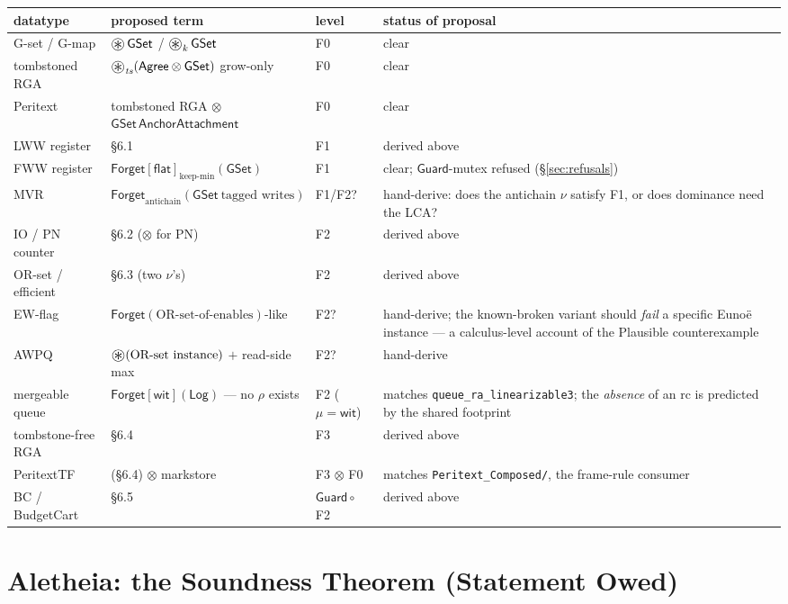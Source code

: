 \documentclass[11pt]{article}
\newcommand{\lean}[1]{\texttt{#1}}
\newcommand{\Forget}{\mathsf{Forget}}
\newcommand{\Guard}{\mathsf{Guard}}
\newcommand{\GSet}{\mathsf{GSet}}
\newcommand{\Agree}{\mathsf{Agree}}
\newcommand{\Log}{\mathsf{Log}}
\newcommand{\sepmap}{\mathop{\vcenter{\hbox{\Large$\circledast$}}}}
\newcommand{\ts}{\mathit{ts}}
\renewcommand{\flat}{\mathsf{flat}}
\newcommand{\wit}{\mathsf{wit}}
\begin{document}
\begin{center}
\small
\begin{tabular}{@{}lp{2.0in}lp{1.7in}@{}}
\toprule
datatype & proposed term & level & status of proposal \\
\midrule
G-set / G-map & $\sepmap \GSet$ / $\sepmap_k \GSet$ & F0 & clear \\
tombstoned RGA & $\sepmap_{\ts} (\Agree \otimes \GSet)$ grow-only
  & F0 & clear \\
Peritext & tombstoned RGA $\otimes$ $\GSet\,\mathsf{AnchorAttachment}$
  & F0 & clear \\
LWW register & \S6.1 & F1 & derived above \\
FWW register & $\Forget[\flat]_{\text{keep-min}}(\GSet)$ & F1
  & clear; $\Guard$-mutex refused (\S\ref{sec:refusals}) \\
MVR & $\Forget_{\text{antichain}}(\GSet\ \text{tagged writes})$
  & F1/F2? & hand-derive: does the antichain $\nu$ satisfy F1, or does
    dominance need the LCA? \\
IO / PN counter & \S6.2 ($\otimes$ for PN) & F2 & derived above \\
OR-set / efficient & \S6.3 (two $\nu$'s) & F2 & derived above \\
EW-flag & $\Forget(\text{OR-set-of-enables})$-like & F2?
  & hand-derive; the known-broken variant should \emph{fail} a specific
    Euno\"e instance --- a calculus-level account of the Plausible
    counterexample \\
AWPQ & $\sepmap (\text{OR-set instance})$ $+$ read-side max & F2?
  & hand-derive \\
mergeable queue & $\Forget[\wit](\Log)$ --- no $\rho$ exists
  & F2 ($\mu = \wit$)
  & matches \lean{queue\_ra\_linearizable3}; the \emph{absence} of an rc
    is predicted by the shared footprint \\
tombstone-free RGA & \S6.4 & F3 & derived above \\
PeritextTF & (\S6.4) $\otimes$ markstore & F3 $\otimes$ F0
  & matches \lean{Peritext\_Composed/}, the frame-rule consumer \\
BC / BudgetCart & \S6.5 & $\Guard \circ$ F2 & derived above \\
\bottomrule
\end{tabular}
\end{center}

\section{Aletheia: the Soundness Theorem (Statement Owed)}
\label{sec:aletheia}
\end{document}
